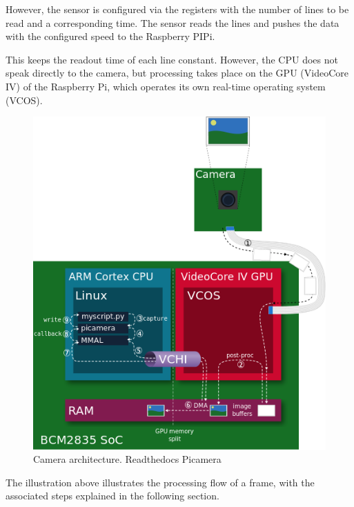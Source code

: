 \documentclass[12pt, a4paper]{report}
\begin{document}
    However, the sensor is configured via the registers with the number of lines to be read and a corresponding time. The sensor reads the lines and pushes the data with the configured speed to the Raspberry PIPi.
    
    This keeps the readout time of each line constant. However, the CPU does not speak directly to the camera, but processing takes place on the GPU (VideoCore IV) of the Raspberry Pi, which operates its own real-time operating system (VCOS).
    
    \bigskip
    \noindent
    \begin{figure}
    \centering
    \includegraphics[scale=0.6]{Images/camera_architecture.png}
    
    \caption{Camera architecture. Readthedocs Picamera}
    \end{figure}
    
    
    
    \bigskip
    
    The illustration above illustrates the processing flow of a frame, with the associated steps explained in the following section.
    
\end{document}
